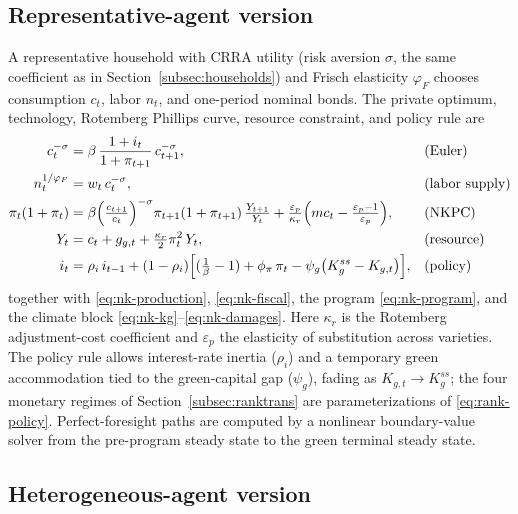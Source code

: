 \documentclass[12pt]{article}
\begin{document}
\subsection{Representative-agent version}\label{app:nkrank}

A representative household with CRRA utility (risk aversion $\sigma$, the
same coefficient as in Section~\ref{subsec:households}) and Frisch elasticity
$\varphi_F$ chooses consumption $c_t$, labor $n_t$, and one-period nominal bonds.
The private optimum, technology, Rotemberg Phillips curve, resource
constraint, and policy rule are
\begin{align}
c_t^{-\sigma} &= \beta\,\frac{1+i_t}{1+\pi_{t+1}}\,c_{t+1}^{-\sigma},
  &&\text{(Euler)} \label{eq:rank-euler}\\
n_t^{1/\varphi_F} &= w_t\,c_t^{-\sigma}, &&\text{(labor supply)} \label{eq:rank-labor}\\
\pi_t(1+\pi_t) &= \beta\Bigl(\tfrac{c_{t+1}}{c_t}\Bigr)^{-\sigma}
  \pi_{t+1}(1+\pi_{t+1})\,\tfrac{Y_{t+1}}{Y_t}
  + \tfrac{\varepsilon_p}{\kappa_r}\Bigl(mc_t-\tfrac{\varepsilon_p-1}{\varepsilon_p}\Bigr),
  &&\text{(NKPC)} \label{eq:rank-nkpc}\\
Y_t &= c_t + g_{g,t} + \tfrac{\kappa_r}{2}\pi_t^2\,Y_t,
  &&\text{(resource)} \label{eq:rank-resource}\\
i_t &= \rho_i\, i_{t-1} + (1-\rho_i)\Bigl[(\tfrac{1}{\beta}-1)
  + \phi_\pi\,\pi_t - \psi_g\bigl(K_g^{ss}-K_{g,t}\bigr)\Bigr],
  &&\text{(policy)} \label{eq:rank-policy}
\end{align}
together with \eqref{eq:nk-production}, \eqref{eq:nk-fiscal}, the program
\eqref{eq:nk-program}, and the climate block
\eqref{eq:nk-kg}--\eqref{eq:nk-damages}. Here $\kappa_r$ is the Rotemberg
adjustment-cost coefficient and $\varepsilon_p$ the elasticity of
substitution across varieties. The policy rule allows interest-rate inertia
($\rho_i$) and a temporary green accommodation tied to the green-capital gap
($\psi_g$), fading as $K_{g,t}\to K_g^{ss}$; the four monetary regimes of
Section~\ref{subsec:ranktrans} are parameterizations of
\eqref{eq:rank-policy}. Perfect-foresight paths are computed by a
nonlinear boundary-value solver from the pre-program steady state to the
green terminal steady state.

\subsection{Heterogeneous-agent version}\label{app:nkhank}
\end{document}
